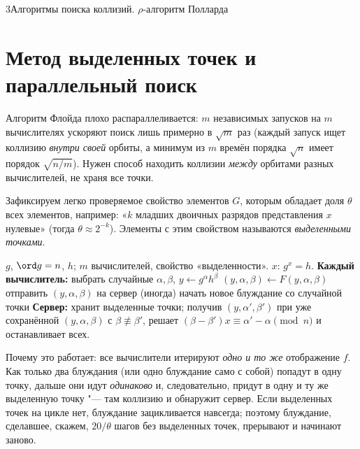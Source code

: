 \begin{lecture}{3}{Алгоритмы поиска коллизий. \texorpdfstring{$\rho$}{ρ}-алгоритм Полларда}
\section{Метод выделенных точек и параллельный поиск}

Алгоритм Флойда плохо распараллеливается: $m$ независимых запусков на $m$ вычислителях
ускоряют поиск лишь примерно в $\sqrt m$ раз (каждый запуск ищет коллизию \emph{внутри своей}
орбиты, а минимум из $m$ времён порядка $\sqrt n$ имеет порядок $\sqrt{n/m}$). Нужен способ
находить коллизии \emph{между} орбитами разных вычислителей, не храня все точки.

\begin{definition}
Зафиксируем легко проверяемое свойство элементов $G$, которым обладает доля $\theta$ всех
элементов, например: «$k$ младших двоичных разрядов представления $x$ нулевые» (тогда
$\theta \approx 2^{-k}$). Элементы с этим свойством называются \emph{выделенными точками}.
\end{definition}

\begin{algorithm}
\begin{algorithmic}[1]
\Require $g$, $\ord g = n$, $h$; $m$ вычислителей, свойство «выделенности».
\Ensure $x$: $g^x = h$.
\State \textbf{Каждый вычислитель:} выбрать случайные $\alpha, \beta$,
  $y \gets g^{\alpha}h^{\beta}$
  \State $(y, \alpha, \beta) \gets F(y, \alpha, \beta)$
    \State отправить $(y, \alpha, \beta)$ на сервер
    \State (иногда) начать новое блуждание со случайной точки
  \EndIf
\EndWhile
\State \textbf{Сервер:} хранит выделенные точки; получив $(y, \alpha', \beta')$ при уже
  сохранённой $(y, \alpha, \beta)$ с $\beta \not\equiv \beta'$, решает
  $(\beta - \beta')x \equiv \alpha' - \alpha \pmod n$ и останавливает всех.
\end{algorithmic}
\end{algorithm}

Почему это работает: все вычислители итерируют \emph{одно и то же} отображение $f$. Как только
два блуждания (или одно блуждание само с собой) попадут в одну точку, дальше они идут
\emph{одинаково} и, следовательно, придут в одну и ту же выделенную точку "--- там коллизию
и обнаружит сервер. Если выделенных точек на цикле нет, блуждание зацикливается навсегда;
поэтому блуждание, сделавшее, скажем, $20/\theta$ шагов без выделенных точек, прерывают и
начинают заново.


\end{lecture}

